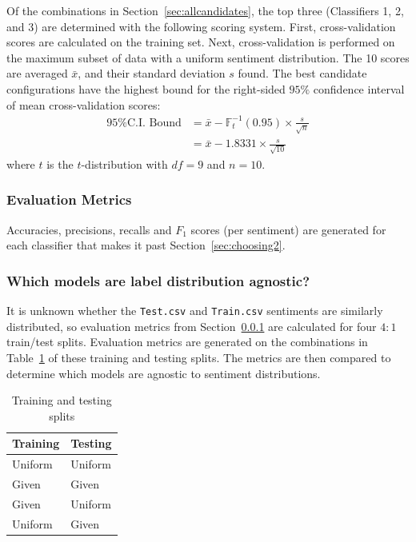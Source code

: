 \documentclass[11pt]{article}
\begin{document}
Of the combinations in Section~\ref{sec:allcandidates}, 
the top three (Classifiers 1, 2, and 3) are determined with the following scoring system.
First, cross-validation scores are calculated on the training set.
Next, cross-validation is performed on the maximum subset of data with a uniform sentiment distribution.
The 10 scores are averaged $\bar{x}$, and their standard deviation $s$ found. 
The best candidate configurations have the highest bound for the right-sided $95\%$ confidence interval of mean cross-validation scores:
\begin{align*}
	\text{95\% C.I. Bound} &= \bar{x} - \mathbb{F}_{t}^{-1}(0.95) \times \frac{s}{\sqrt{n}} \\
	&= \bar{x} - 1.8331 \times \frac{s}{\sqrt{10}}
\end{align*}
where $t$ is the $t$-distribution with $df = 9$ and $n = 10$.

\subsubsection{Evaluation Metrics}\label{sec:evalmetrics}

Accuracies, precisions, recalls and $F_1$ scores (per sentiment) are generated for each classifier that makes it past Section~\ref{sec:choosing2}.

\subsubsection{Which models are label distribution agnostic?}

It is unknown whether the \texttt{Test.csv} and \texttt{Train.csv} sentiments are similarly distributed, 
so evaluation metrics from Section~\ref{sec:evalmetrics} are calculated for four $4:1$ train/test splits.
Evaluation metrics are generated on the combinations in Table~\ref{tbl:train-test} of these training and testing splits.
The metrics are then compared to determine which models are agnostic to sentiment distributions.

\begin{table}[H]
	\begin{center}
		\begin{tabular}{|l|l|}			
			\hline
			Training & Testing \\
			\hline
			Uniform & Uniform \\
			Given & Given \\
			Given & Uniform \\
			Uniform & Given \\
			\hline
		\end{tabular}
		\caption{Training and testing splits}
		\label{tbl:train-test}
	\end{center}
\end{table}
\end{document}
